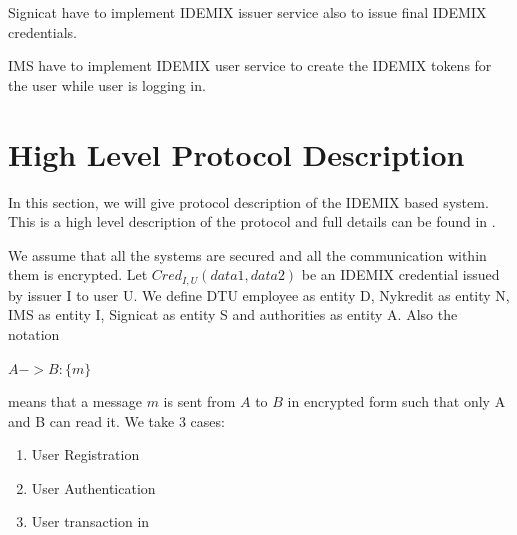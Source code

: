 Signicat have to implement IDEMIX issuer service also to issue final IDEMIX credentials.

IMS have to implement IDEMIX user service to create the IDEMIX tokens for the user while user is logging in.
\section{High Level Protocol Description}
In this section, we will give protocol description of the IDEMIX based system. This is a high level description of the protocol and full details can be found in \cite{camenisch2001efficient}.

We assume that all the systems are secured and all the communication within them is encrypted. Let $Cred_{I,U}(data1,data2)$ be an IDEMIX credential issued by issuer I to user U. We define DTU employee as entity D, Nykredit as entity N, IMS as entity I, Signicat as entity S and authorities as entity A. Also the notation
\begin{center}
$A->B : \{m\}$
\end{center}
means that a message $m$ is sent from $A$ to $B$ in encrypted form such that only A and B can read it.
We take 3 cases:

\begin{enumerate}
\item User Registration
\item User Authentication
\item User transaction in
\end{enumerate}
	
